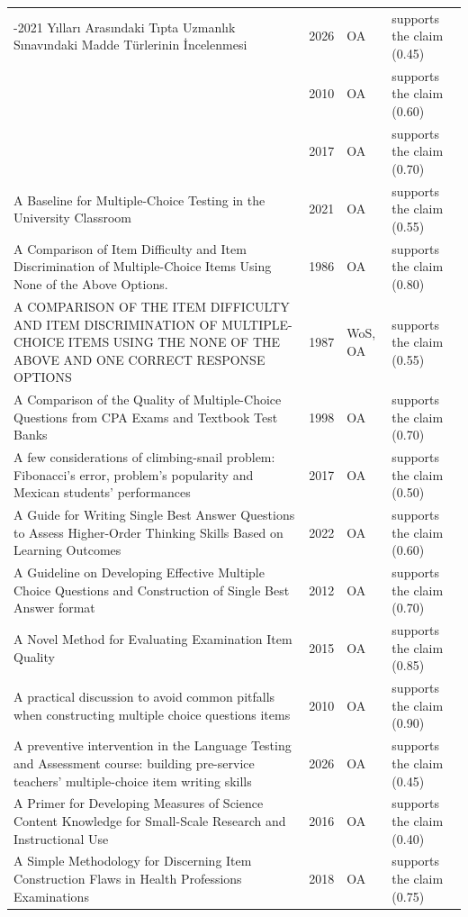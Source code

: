 \begin{longtable}{@{}%
  >{\raggedright\arraybackslash}p{}c%
  >{\raggedright\arraybackslash}p{}%
  >{\raggedright\arraybackslash}p{}@{}}
2012-2021 Yılları Arasındaki Tıpta Uzmanlık Sınavındaki Madde Türlerinin İncelenmesi & 2026 & OA & supports the claim (0.45) \\
\textquotedbl{}                           & 2010 & OA & supports the claim (0.60) \\
\textquotedbl{}                    \textquotedbl{} & 2017 & OA & supports the claim (0.70) \\
A Baseline for Multiple-Choice Testing in the University Classroom & 2021 & OA & supports the claim (0.55) \\
A Comparison of Item Difficulty and Item Discrimination of Multiple-Choice Items Using \textquotedbl{}None of the Above\textquotedbl{} Options. & 1986 & OA & supports the claim (0.80) \\
A COMPARISON OF THE ITEM DIFFICULTY AND ITEM DISCRIMINATION OF MULTIPLE-CHOICE ITEMS USING THE NONE OF THE ABOVE AND ONE CORRECT RESPONSE OPTIONS & 1987 & WoS, OA & supports the claim (0.55) \\
A Comparison of the Quality of Multiple-Choice Questions from CPA Exams and Textbook Test Banks & 1998 & OA & supports the claim (0.70) \\
A few considerations of climbing-snail problem: Fibonacci's error, problem's popularity and Mexican students' performances & 2017 & OA & supports the claim (0.50) \\
A Guide for Writing Single Best Answer Questions to Assess Higher-Order Thinking Skills Based on Learning Outcomes & 2022 & OA & supports the claim (0.60) \\
A Guideline on Developing Effective Multiple Choice Questions and Construction of Single Best Answer format & 2012 & OA & supports the claim (0.70) \\
A Novel Method for Evaluating Examination Item Quality & 2015 & OA & supports the claim (0.85) \\
A practical discussion to avoid common pitfalls when constructing multiple choice questions items & 2010 & OA & supports the claim (0.90) \\
A preventive intervention in the Language Testing and Assessment course: building pre-service teachers' multiple-choice item writing skills & 2026 & OA & supports the claim (0.45) \\
A Primer for Developing Measures of Science Content Knowledge for Small-Scale Research and Instructional Use & 2016 & OA & supports the claim (0.40) \\
A Simple Methodology for Discerning Item Construction Flaws in Health Professions Examinations & 2018 & OA & supports the claim (0.75) \\

\end{longtable}
